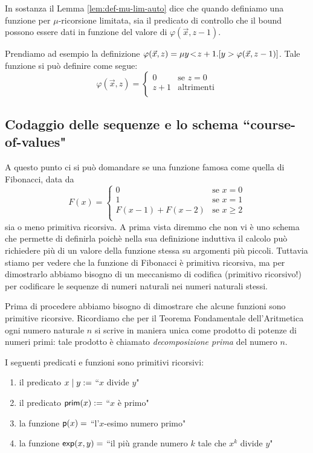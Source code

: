 \documentclass[runningheads,a4paper]{llncs}
\begin{document}
In sostanza il Lemma \ref{lem:def-mu-lim-auto} dice che quando definiamo una funzione per $\mu$-ricorsione limitata, sia il predicato di controllo che il bound possono essere dati in funzione del valore di $\varphi(\vec x,z-1)$. 

Prendiamo ad esempio la definizione $\varphi(\vec x,z) = \mu{y}\!<\!{z+1}.[y > \varphi(\vec x,z-1)]$. Tale funzione si pu\`{o} definire come segue:
$$
\varphi(\vec x,z) = 
\begin{cases}
0 & \mbox{se } z = 0 \\
z+1 & \mbox{altrimenti} \\
\end{cases}
$$

\subsection{Codaggio delle sequenze e lo schema ``course-of-values"}

A questo punto ci si pu\`{o} domandare se una funzione famosa come quella di Fibonacci, data da
$$ 
F(x) =
\begin{cases}
0 & \mbox{se } x = 0 \\
1 & \mbox{se } x = 1 \\
F(x-1) + F(x-2) & \mbox{se } x \geq 2 \\
\end{cases}
$$
sia o meno primitiva ricorsiva. A prima vista diremmo che non vi \`{e} uno schema che permette di definirla poich\`{e} nella sua definizione induttiva il calcolo pu\`{o} richiedere pi\`{u} di un valore della funzione stessa su argomenti pi\`{u} piccoli. Tuttavia stiamo per vedere che la funzione di Fibonacci \`{e} primitiva ricorsiva, ma per dimostrarlo abbiamo bisogno di un meccanismo di codifica (primitivo ricorsivo!) per codificare le sequenze di numeri naturali nei numeri naturali stessi.

Prima di procedere abbiamo bisogno di dimostrare che alcune funzioni sono primitive ricorsive. Ricordiamo che per il Teorema Fondamentale dell'Aritmetica ogni numero naturale $n$ si scrive in maniera unica come prodotto di potenze di numeri primi: tale prodotto \`{e} chiamato \emph{decomposizione prima} del numero $n$.

\begin{lemma}
I seguenti predicati e funzioni sono primitivi ricorsivi:
\begin{enumerate}[label=(\roman*)]
\item il predicato $x \mid y \mathrel{:=}$ ``$x$ divide $y$"
\item il predicato $\mathsf{prim}(x) \mathrel{:=}$ ``$x$ \`{e} primo"
\item la funzione $\mathsf{p}(x) =$ ``l'$x$-esimo numero primo"
\item la funzione $\mathsf{exp}(x,y) =$ ``il pi\`{u} grande numero $k$ tale che $x^k$ divide $y$"
\end{enumerate}
\end{lemma}
\end{document}
